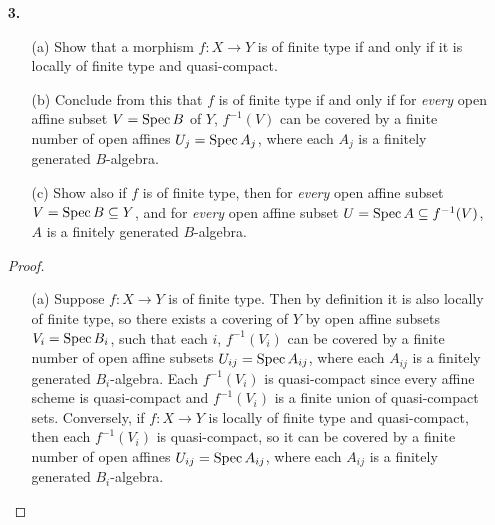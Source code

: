 \documentclass[a4paper]{article}
\begin{document}
\begin{enumerate} [label=\textbf{\arabic*.}, leftmargin=0em]
          \begin{proof}
              We reduce to proving the following statement: let $f : X \to Y$ be a morphism of schemes with $Y$ affine, which can be covered by open subsets $V_i$ such that $f^{-1}(V_i)$ is quasi-compact in $X$. Then $X$ is quasi-compact. Indeed, $Y$ is quasi-compact, so a finite number of $i$ will do, and a finite union of quasi-compact sets is quasi-compact, and $X = f^{-1}(Y) = f^{-1}(\bigcup_{i = 1}^n V_i) = \bigcup_{i = 1}^n f^{-1}(V_i)$, hence $X$ is quasi-compact.
          \end{proof}

    \item[\textbf{3.}]
          \begin{itemize}
              \item[(a)] Show that a morphism $f : X \to Y$ is of finite type if and only if it is locally of finite type and quasi-compact.
              \item[(b)] Conclude from this that $f$ is of finite type if and only if for \textit{every} open affine subset $V = \operatorname{Spec}{B}$ of $Y$, $f^{-1}(V)$ can be covered by a finite number of open affines $U_j = \operatorname{Spec}{A_j}$, where each $A_j$ is a finitely generated $B$-algebra.
              \item[(c)] Show also if $f$ is of finite type, then for \textit{every} open affine subset $V = \operatorname{Spec}{B} \subseteq Y$, and for \textit{every} open affine subset $U = \operatorname{Spec}{A} \subseteq f^{-1}(V)$, $A$ is a finitely generated $B$-algebra.
          \end{itemize}

          \begin{proof} $ $ \vspace{0pt}
              \begin{itemize} [leftmargin=0cm]
                  \item[(a)] Suppose $f : X \to Y$ is of finite type. Then by definition it is also locally of finite type, so there exists a covering of $Y$ by open affine subsets $V_i = \operatorname{Spec}{B_i}$, such that each $i$, $f^{-1}(V_i)$ can be covered by a finite number of open affine subsets $U_{ij} = \operatorname{Spec}{A_{ij}}$, where each $A_{ij}$ is a finitely generated $B_i$-algebra. Each $f^{-1}(V_i)$ is quasi-compact since every affine scheme is quasi-compact and $f^{-1}(V_i)$ is a finite union of quasi-compact sets. Conversely, if $f : X \to Y$ is locally of finite type and quasi-compact, then each $f^{-1}(V_i)$ is quasi-compact, so it can be covered by a finite number of open affines $U_{ij} = \operatorname{Spec}{A_{ij}}$, where each $A_{ij}$ is a finitely generated $B_i$-algebra.


\end{itemize}
\end{proof}
\end{enumerate}
\end{document}
